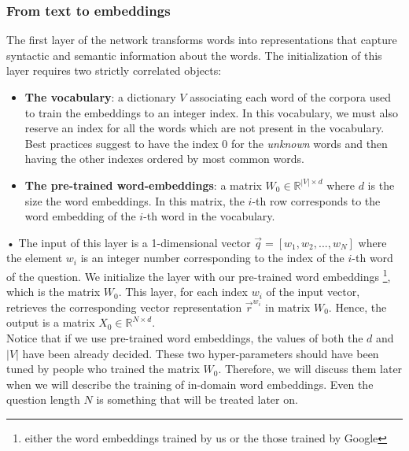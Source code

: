 \documentclass[10pt,twocolumn,letterpaper]{article}
\begin{document}
\subsubsection{From text to embeddings}
The first layer of the network transforms words into representations that capture syntactic and semantic information about the words. The initialization of this layer requires two strictly correlated objects:
\begin{itemize}
\item \textbf{The vocabulary}: a dictionary $V$ associating each word of the corpora used to train the embeddings to an integer index. In this vocabulary, we must also reserve an index for all the words which are not present in the vocabulary. Best practices suggest to have the index $0$ for the \emph{unknown} words and then having the other indexes ordered by most common words.
\item \textbf{The pre-trained word-embeddings}: a matrix $W_0 \in \mathbb{R}^{|V| \times d}$ where $d$ is the size the word embeddings. In this matrix, the $i$-th row corresponds to the word embedding of the $i$-th word in the vocabulary.
\end{itemize}•
The input of this layer is a 1-dimensional vector $\vec{q}=[w_1, w_2, ... , w_N]$ where the element $w_i$ is an integer number corresponding to the index of the $i$-th word of the question. We initialize the layer with our pre-trained word embeddings \footnote{either the word embeddings trained by us or the those trained by Google}, which is the matrix $W_0$. This layer, for each index $w_i$ of the input vector, retrieves the corresponding vector representation $\vec{r}^{w_i}$ in matrix $W_0$. Hence, the output is a matrix $X_0 \in \mathbb{R}^{N \times d}$.\\
Notice that if we use pre-trained word embeddings, the values of both the $d$ and $|V|$ have been already decided. These two hyper-parameters should have been tuned by people who trained the matrix $W_0$. Therefore, we will discuss them later when we will describe the training of in-domain word embeddings.  Even the question length $N$ is something that will be treated later on.
\end{document}
